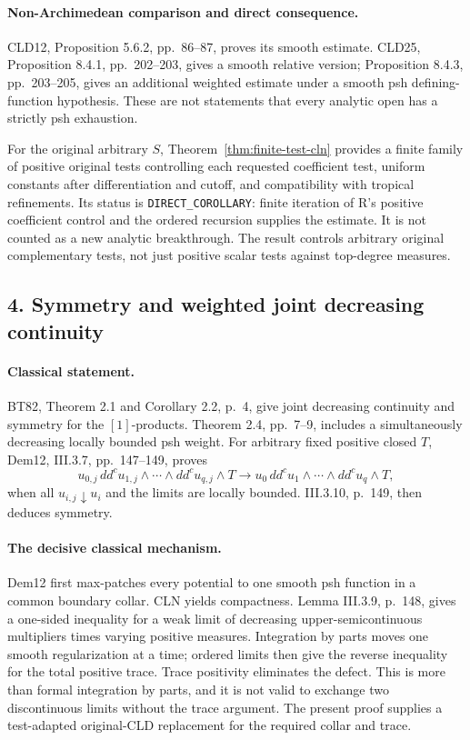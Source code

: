 \documentclass[11pt,a4paper]{article}
\numberwithin{equation}{section}
\theoremstyle{definition}
\theoremstyle{remark}
\begin{document}
\paragraph{Non-Archimedean comparison and direct consequence.}
CLD12, Proposition 5.6.2, pp.~86--87, proves its smooth estimate.
CLD25, Proposition 8.4.1, pp.~202--203, gives a smooth relative version;
Proposition 8.4.3, pp.~203--205, gives an additional weighted estimate
under a smooth psh defining-function hypothesis. These are not statements
that every analytic open has a strictly psh exhaustion.
\cite[Proposition 5.6.2]{CLD12}\cite[\S8.4]{CLD25}

For the original arbitrary \(S\), Theorem~\ref{thm:finite-test-cln}
provides a finite family of positive original tests controlling each
requested coefficient test, uniform constants after differentiation and
cutoff, and compatibility with tropical refinements. Its status is
\texttt{DIRECT\_COROLLARY}: finite iteration of R's positive coefficient
control and the ordered recursion supplies the estimate. It is not counted
as a new analytic breakthrough. The result controls arbitrary original
complementary tests, not just positive scalar tests against top-degree
measures.

\subsection{4. Symmetry and weighted joint decreasing continuity}

\paragraph{Classical statement.}
BT82, Theorem 2.1 and Corollary 2.2, p.~4, give joint decreasing
continuity and symmetry for the \([1]\)-products. Theorem 2.4,
pp.~7--9, includes a simultaneously decreasing locally bounded psh weight.
For arbitrary fixed positive closed \(T\), Dem12, III.3.7,
pp.~147--149, proves
\[
 u_{0,j}\,dd^cu_{1,j}\wedge\cdots\wedge dd^cu_{q,j}\wedge T
 \longrightarrow
 u_0\,dd^cu_1\wedge\cdots\wedge dd^cu_q\wedge T,
\]
when all \(u_{i,j}\downarrow u_i\) and the limits are locally bounded.
III.3.10, p.~149, then deduces symmetry.\cite[Theorems 2.1, 2.4]{BT82}
\cite[III.3.7--3.10]{Dem12}

\paragraph{The decisive classical mechanism.}
Dem12 first max-patches every potential to one smooth psh function in a
common boundary collar. CLN yields compactness. Lemma III.3.9, p.~148,
gives a one-sided inequality for a weak limit of decreasing
upper-semicontinuous multipliers times varying positive measures.
Integration by parts moves one smooth regularization at a time; ordered
limits then give the reverse inequality for the total positive trace.
Trace positivity eliminates the defect. This is more than formal
integration by parts, and it is not valid to exchange two discontinuous
limits without the trace argument. The present proof supplies a
test-adapted original-CLD replacement for the required collar and trace.
\end{document}
